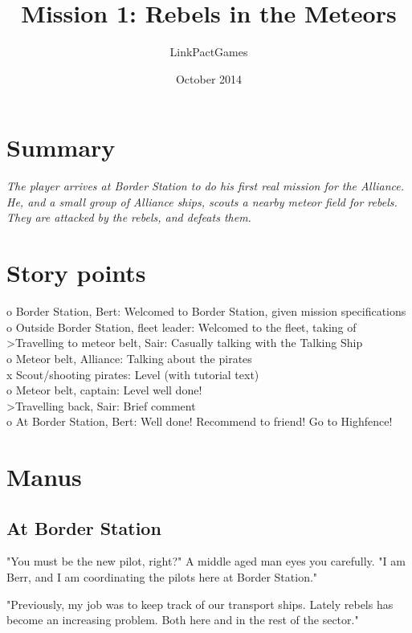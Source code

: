 \documentclass[a4paper,12pt]{article}
\begin{document}
\title{Mission 1: Rebels in the Meteors}
\author{LinkPactGames}
\date{October 2014}
\maketitle

\section{Summary}
\textit{The player arrives at Border Station to do his first real mission
for the Alliance. He, and a small group of Alliance ships, scouts a nearby meteor field
for rebels. They are attacked by the rebels, and defeats them.}

\section{Story points}

o Border Station, Bert: Welcomed to Border Station, given mission specifications\\
o Outside Border Station, fleet leader: Welcomed to the fleet, taking of\\
\textgreater  Travelling to meteor belt, Sair: Casually talking with the Talking Ship\\
o Meteor belt, Alliance: Talking about the pirates\\
x Scout/shooting pirates: Level (with tutorial text)\\
o Meteor belt, captain: Level well done!\\
\textgreater  Travelling back, Sair: Brief comment\\
o At Border Station, Bert: Well done! Recommend to friend! Go to Highfence!

\section{Manus}

\subsection{At Border Station}

"You must be the new pilot, right?" A middle aged man eyes you carefully.
"I am Berr, and I am coordinating the pilots here at Border Station."

"Previously, my job was to keep track of our transport ships. Lately
rebels has become an increasing problem. Both here and in the rest of the sector."
\end{document}
